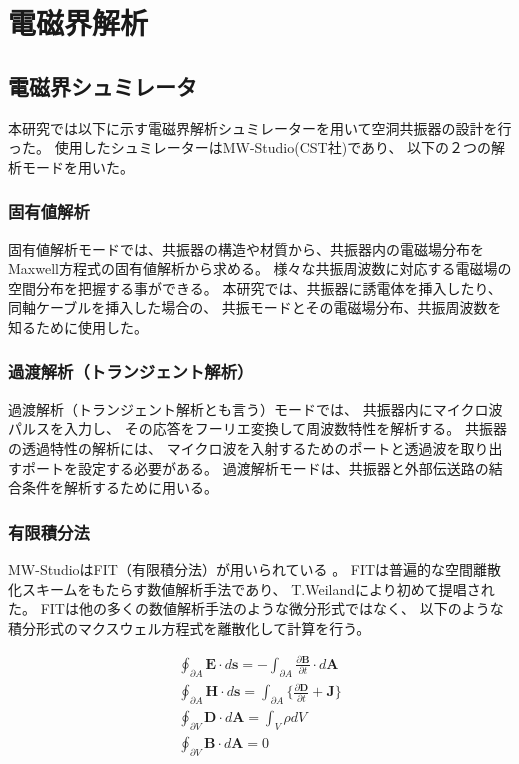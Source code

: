 \chapter{電磁界解析}

\section{電磁界シュミレータ}
本研究では以下に示す電磁界解析シュミレーターを用いて空洞共振器の設計を行った。
使用したシュミレーターはMW-Studio(CST社)\cite{CST}であり、
以下の２つの解析モードを用いた\cite{MWS-1}。

\subsection*{固有値解析}
固有値解析モードでは、共振器の構造や材質から、共振器内の電磁場分布をMaxwell方程式の固有値解析から求める。
様々な共振周波数に対応する電磁場の空間分布を把握する事ができる。
本研究では、共振器に誘電体を挿入したり、同軸ケーブルを挿入した場合の、
共振モードとその電磁場分布、共振周波数を知るために使用した。

\subsection*{過渡解析（トランジェント解析）}
過渡解析（トランジェント解析とも言う）モードでは、
共振器内にマイクロ波パルスを入力し、
その応答をフーリエ変換して周波数特性を解析する。
共振器の透過特性の解析には、
マイクロ波を入射するためのポートと透過波を取り出すポートを設定する必要がある。
過渡解析モードは、共振器と外部伝送路の結合条件を解析するために用いる。

\subsection*{有限積分法}
MW-StudioはFIT（有限積分法）が用いられている
\cite{MWS-2}。
FITは普遍的な空間離散化スキームをもたらす数値解析手法であり、
T.Weilandにより初めて提唱された\cite{FIT}。
FITは他の多くの数値解析手法のような微分形式ではなく、
以下のような積分形式のマクスウェル方程式を離散化して計算を行う。

\begin{eqnarray}
  \oint_{\partial A} \mathbf{E} \cdot d\mathbf{s}
  = - \int_{\partial A} \frac{\partial \mathbf{B}}{\partial t} \cdot d  \mathbf{A}\\
  \oint_{\partial A} \mathbf{H} \cdot d\mathbf{s} =  \int_{\partial A} \{ \frac{\partial \mathbf{D}}{\partial t} + \mathbf{J} \} \\
  \oint_{\partial V} \mathbf{D} \cdot d\mathbf{A} = \int_V \rho dV \\
  \oint_{\partial V} \mathbf{B} \cdot d\mathbf{A} = 0
\end{eqnarray}

